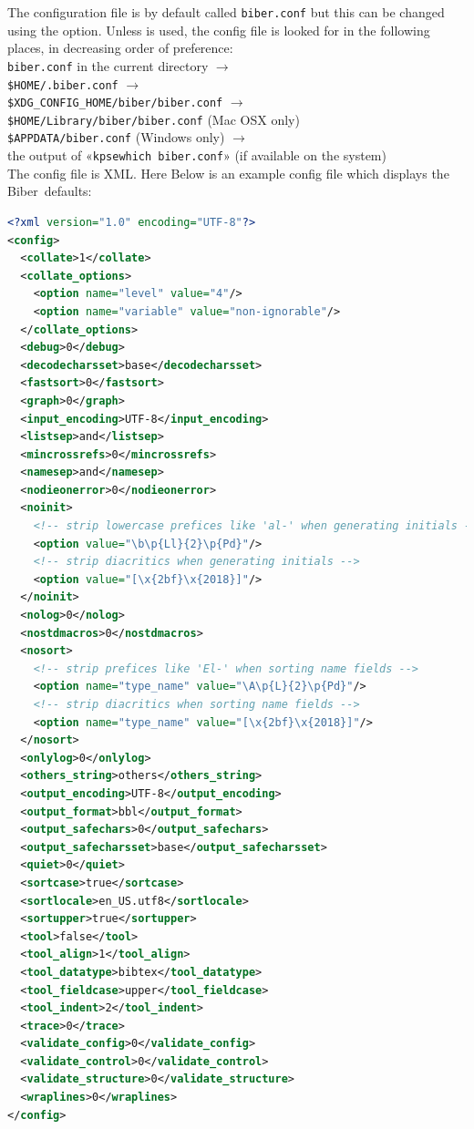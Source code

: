 \documentclass{ltxdockit}
\newcommand*{\biber}{Biber\xspace}
\begin{document}
The configuration file is by default called \verb+biber.conf+ but this can
be changed using the  option. Unless
 is used, the config file is
looked for in the following places, in decreasing order of preference:\\[2ex]

\noindent \verb+biber.conf+ in the current directory $\rightarrow$\\
\hspace*{1em}\verb+$HOME/.biber.conf+ $\rightarrow$\\
\hspace*{2em}\verb+$XDG_CONFIG_HOME/biber/biber.conf+ $\rightarrow$\\
\hspace*{3em}\verb+$HOME/Library/biber/biber.conf+ (Mac OSX only)\\
\hspace*{3em}\verb+$APPDATA/biber.conf+ (Windows only) $\rightarrow$\\
\hspace*{4em}the output of «\verb+kpsewhich biber.conf+» (if available on the
system)\\[2ex]

\noindent The config file is XML. Here Below is
an example config file which displays the \biber\ defaults:

\begin{lstlisting}[language=xml]
<?xml version="1.0" encoding="UTF-8"?>
<config>
  <collate>1</collate>
  <collate_options>
    <option name="level" value="4"/>
    <option name="variable" value="non-ignorable"/>
  </collate_options>
  <debug>0</debug>
  <decodecharsset>base</decodecharsset>
  <fastsort>0</fastsort>
  <graph>0</graph>
  <input_encoding>UTF-8</input_encoding>
  <listsep>and</listsep>
  <mincrossrefs>0</mincrossrefs>
  <namesep>and</namesep>
  <nodieonerror>0</nodieonerror>
  <noinit>
    <!-- strip lowercase prefices like 'al-' when generating initials -->
    <option value="\b\p{Ll}{2}\p{Pd}"/>
    <!-- strip diacritics when generating initials -->
    <option value="[\x{2bf}\x{2018}]"/>
  </noinit>
  <nolog>0</nolog>
  <nostdmacros>0</nostdmacros>
  <nosort>
    <!-- strip prefices like 'El-' when sorting name fields -->
    <option name="type_name" value="\A\p{L}{2}\p{Pd}"/>
    <!-- strip diacritics when sorting name fields -->
    <option name="type_name" value="[\x{2bf}\x{2018}]"/>
  </nosort>
  <onlylog>0</onlylog>
  <others_string>others</others_string>
  <output_encoding>UTF-8</output_encoding>
  <output_format>bbl</output_format>
  <output_safechars>0</output_safechars>
  <output_safecharsset>base</output_safecharsset>
  <quiet>0</quiet>
  <sortcase>true</sortcase>
  <sortlocale>en_US.utf8</sortlocale>
  <sortupper>true</sortupper>
  <tool>false</tool>
  <tool_align>1</tool_align>
  <tool_datatype>bibtex</tool_datatype>
  <tool_fieldcase>upper</tool_fieldcase>
  <tool_indent>2</tool_indent>
  <trace>0</trace>
  <validate_config>0</validate_config>
  <validate_control>0</validate_control>
  <validate_structure>0</validate_structure>
  <wraplines>0</wraplines>
</config>
\end{lstlisting}
\end{document}
